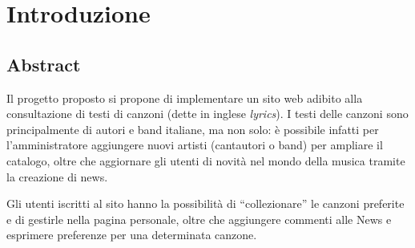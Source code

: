 \chapter{Introduzione}

\section{Abstract}
Il progetto proposto si propone di implementare un sito web adibito alla consultazione di testi di canzoni (dette in inglese \textit{lyrics}).
I testi delle canzoni sono principalmente di autori e band italiane, ma non solo: \`e possibile infatti per l'amministratore aggiungere nuovi artisti (cantautori o band) per ampliare il catalogo, oltre che aggiornare gli utenti di novit\`a nel mondo della musica tramite la creazione di news.

Gli utenti iscritti al sito hanno la possibilit\`a di ``collezionare'' le canzoni preferite e di gestirle nella pagina personale, oltre che aggiungere commenti alle News e esprimere preferenze per una determinata canzone.
